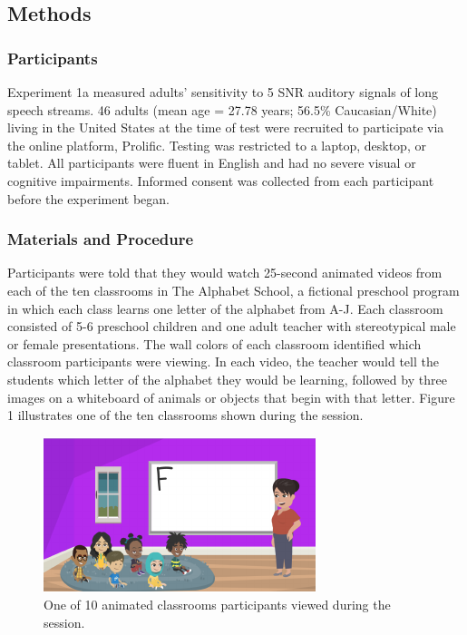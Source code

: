 \documentclass[10pt, letterpaper]{article}
\newenvironment{CodeChunk}{}{}
\begin{document}
\hypertarget{methods}{%
\subsection{\texorpdfstring{\textbf{Methods}}{Methods}}\label{methods}}

\hypertarget{participants}{%
\subsubsection{Participants}\label{participants}}

Experiment 1a measured adults' sensitivity to 5 SNR auditory signals of
long speech streams. 46 adults (mean age = 27.78 years; 56.5\%
Caucasian/White) living in the United States at the time of test were
recruited to participate via the online platform, Prolific. Testing was
restricted to a laptop, desktop, or tablet. All participants were fluent
in English and had no severe visual or cognitive impairments. Informed
consent was collected from each participant before the experiment began.

\hypertarget{materials-and-procedure}{%
\subsubsection{Materials and Procedure}\label{materials-and-procedure}}

Participants were told that they would watch 25-second animated videos
from each of the ten classrooms in The Alphabet School, a fictional
preschool program in which each class learns one letter of the alphabet
from A-J. Each classroom consisted of 5-6 preschool children and one
adult teacher with stereotypical male or female presentations. The wall
colors of each classroom identified which classroom participants were
viewing. In each video, the teacher would tell the students which letter
of the alphabet they would be learning, followed by three images on a
whiteboard of animals or objects that begin with that letter. Figure 1
illustrates one of the ten classrooms shown during the session.

\begin{CodeChunk}
\begin{figure}[H]

{\centering \includegraphics{figs/image 1-1} 

}

\caption[One of 10 animated classrooms participants viewed during the session]{One of 10 animated classrooms participants viewed during the session.}\label{fig:image 1}
\end{figure}
\end{CodeChunk}
\end{document}
